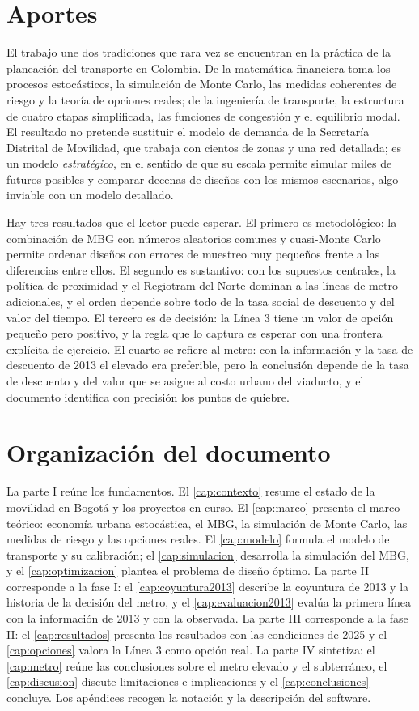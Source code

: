 \section{Aportes}

El trabajo une dos tradiciones que rara vez se encuentran en la práctica de la planeación del
transporte en Colombia. De la matemática financiera toma los procesos estocásticos, la simulación de
Monte Carlo, las medidas coherentes de riesgo y la teoría de opciones reales; de la ingeniería de
transporte, la estructura de cuatro etapas simplificada, las funciones de congestión y el equilibrio
modal. El resultado no pretende sustituir el modelo de demanda de la Secretaría Distrital de
Movilidad, que trabaja con cientos de zonas y una red detallada; es un modelo \emph{estratégico}, en el
sentido de que su escala permite simular miles de futuros posibles y comparar decenas de diseños con
los mismos escenarios, algo inviable con un modelo detallado.

Hay tres resultados que el lector puede esperar. El primero es metodológico: la combinación de MBG con
números aleatorios comunes y cuasi-Monte Carlo permite ordenar diseños con errores de muestreo muy
pequeños frente a las diferencias entre ellos. El segundo es sustantivo: con los supuestos centrales,
la política de proximidad y el Regiotram del Norte dominan a las líneas de metro adicionales, y el
orden depende sobre todo de la tasa social de descuento y del valor del tiempo. El tercero es de
decisión: la Línea 3 tiene un valor de opción pequeño pero positivo, y la regla que lo captura es
esperar con una frontera explícita de ejercicio. El cuarto se refiere al metro: con la información y
la tasa de descuento de 2013 el elevado era preferible, pero la conclusión depende de la tasa de
descuento y del valor que se asigne al costo urbano del viaducto, y el documento identifica con
precisión los puntos de quiebre.

\section{Organización del documento}

La parte I reúne los fundamentos. El \cref{cap:contexto} resume el estado de la movilidad en Bogotá
y los proyectos en curso. El \cref{cap:marco} presenta el marco teórico: economía urbana estocástica,
el MBG, la simulación de Monte Carlo, las medidas de riesgo y las opciones reales. El
\cref{cap:modelo} formula el modelo de transporte y su calibración; el \cref{cap:simulacion}
desarrolla la simulación del MBG, y el \cref{cap:optimizacion} plantea el problema de diseño óptimo.
La parte II corresponde a la fase I: el \cref{cap:coyuntura2013} describe la coyuntura de 2013 y la
historia de la decisión del metro, y el \cref{cap:evaluacion2013} evalúa la primera línea con la
información de 2013 y con la observada. La parte III corresponde a la fase II: el
\cref{cap:resultados} presenta los resultados con las condiciones de 2025 y el \cref{cap:opciones}
valora la Línea 3 como opción real. La parte IV sintetiza: el \cref{cap:metro} reúne las conclusiones
sobre el metro elevado y el subterráneo, el \cref{cap:discusion} discute limitaciones e implicaciones y
el \cref{cap:conclusiones} concluye. Los apéndices recogen la notación y la descripción del software.
